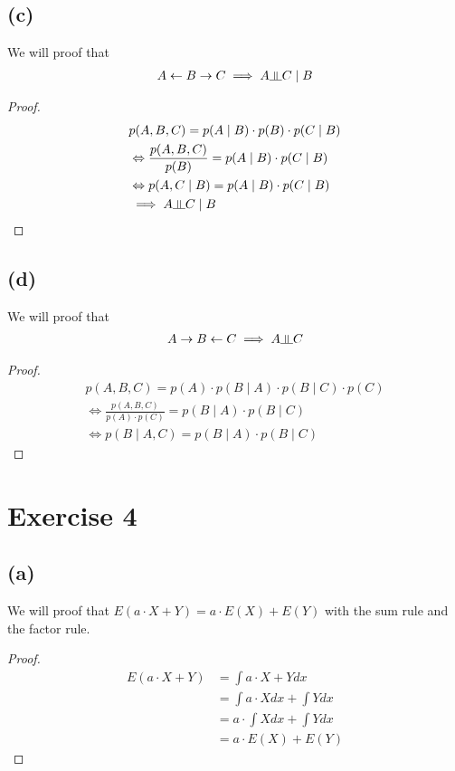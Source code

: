 \documentclass{article}
\newcommand{\dsep}{\rotatebox[origin=c]{90}{$\models$}}
\begin{document}
\subsection*{(c)}
We will proof that 
\begin{align*}
    A \leftarrow B \rightarrow C \implies A \dsep C \mid B
\end{align*}
\begin{proof}
\begin{align*}
	&p(A,B,C) = p(A \mid B) \cdot p(B) \cdot p(C \mid B)  \\
	&\Leftrightarrow \frac{p(A,B,C)}{p(B)} = p(A\mid B) \cdot p(C\mid B) \\
	&\Leftrightarrow p(A,C \mid B) = p(A\mid B) \cdot p(C\mid B) \\
    &\implies A \dsep C \mid B
\end{align*}
\end{proof}

\subsection*{(d)}
We will proof that 
\begin{align*}
    A \rightarrow B \leftarrow C \implies A \dsep C 
\end{align*}
\begin{proof}
\begin{align*}
	p(A,B,C) = p(A) \cdot p(B \mid A) \cdot p(B \mid C) \cdot p(C) \\
	\Leftrightarrow \frac{p(A,B,C)}{p(A) \cdot p(C)} = p(B\mid A) \cdot p(B\mid C) \\
	\Leftrightarrow p(B \mid A,C) = p(B\mid A) \cdot p(B\mid C)
    
\end{align*}
\end{proof}

\section*{Exercise 4}
\subsection*{(a)}
 We will proof that $E(a \cdot X + Y) = a \cdot E(X) + E(Y) $ with the sum rule and the factor rule.
\begin{proof}
	\begin{align*}
	E(a \cdot X + Y)
	& = \int a \cdot X + Y dx \\
	&= \int a \cdot X dx + \int Y dx \\
	&= a \cdot \int X dx + \int Y dx \\
	&= a \cdot E(X) + E(Y)
	\end{align*}
\end{proof}
\end{document}
